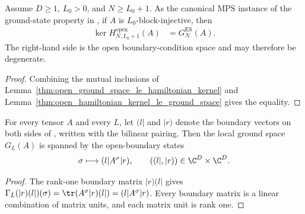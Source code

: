 \begin{lemma}
    \label{thm:open_parent_hamiltonian_kernel_ground_space}
    \leanok
    Assume $D\geq1$, $L_0>0$, and $N\geq L_0+1$. As the canonical MPS
    instance of the ground-state property in
    \cite[Equation~(3.13)]{Nachtergaele1996Spectral}, if $A$ is
    $L_0$-block-injective, then
    \begin{align}
        \ker H^{\mathrm{open}}_{N,L_0+1}(A)
         & =G_N^{\mathrm{ES}}(A).
        \label{eq:open_parent_hamiltonian_kernel_ground_space}
    \end{align}
    The right-hand side is the open boundary-condition space and may
    therefore be degenerate.
\end{lemma}

\begin{proof}
    \leanok
    Combining the mutual inclusions of
    Lemma~\ref{thm:open_ground_space_le_hamiltonian_kernel} and
    Lemma~\ref{thm:open_hamiltonian_kernel_le_ground_space} gives the
    equality.
\end{proof}

\begin{lemma}
    \label{thm:ground_space_span_open_states}
    \leanok
    For every tensor $A$ and every $L$, let $(l|$ and $|r)$ denote the
    boundary vectors on both sides of \cite[line~1174]{Cirac2021Matrix},
    written with the bilinear pairing. Then the local ground space
    $G_{L}(A)$ is spanned by the open-boundary states
    \begin{align}
        \sigma\longmapsto(l|A^{\sigma}|r),
        \qquad ((l|,|r))\in\C^{D}\times\C^{D}.
        \notag
    \end{align}
\end{lemma}

\begin{proof}
    \leanok
    The rank-one boundary matrix $|r)(l|$ gives
    $\Gamma_{L}(|r)(l|)(\sigma)=\tr(A^{\sigma}|r)(l|)
        =(l|A^{\sigma}|r)$. Every boundary matrix is a linear
    combination of matrix units, and each matrix unit is rank one.
\end{proof}

